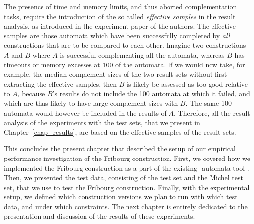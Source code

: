 The presence of time and memory limits, and thus aborted complementation tasks, require the introduction of the so called \textit{effective samples} in the result analysis, as introduced in the experiment paper of the \goal{} authors. The effective samples are those automata which have been successfully completed by \textit{all} constructions that are to be compared to each other. Imagine two constructions $A$ and $B$ where $A$ is successful complementing all the automata, whereas $B$ has timeouts or memory excesses at 100 of the automata. If we would now take, for example, the median complement sizes of the two result sets without first extracting the effective samples, then $B$ is likely be assessed as too good relative to $A$, because $B$'s results do not include the 100 automata at which it failed, and which are thus likely to have large complement sizes with $B$. The same 100 automata would however be included in the results of $A$. Therefore, all the result analysis of the experiments with the \goal{} test sets, that we present in Chapter~\ref{chap_results}, are based on the effective samples of the result sets.

This concludes the present chapter that described the setup of our empirical performance investigation of the Fribourg construction. First, we covered how we implemented the Fribourg construction as a part of the existing \om-automata tool \goal. Then, we presented the test data, consisting of the \goal{} test set and the Michel test set, that we use to test the Fribourg construction. Finally, with the experimental setup, we defined which construction versions we plan to run with which test data, and under which constraints. The next chapter is entirely dedicated to the presentation and discussion of the results of these experiments.


